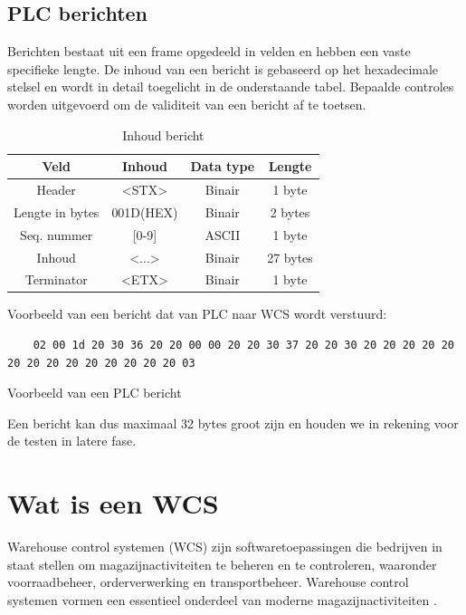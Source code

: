 \subsection{PLC berichten}
Berichten bestaat uit een frame opgedeeld in velden en hebben een vaste specifieke lengte.
De inhoud van een bericht is gebaseerd op het hexadecimale stelsel en wordt in detail toegelicht in de onderstaande tabel.
Bepaalde controles worden uitgevoerd om de validiteit van een bericht af te toetsen. 

\begin{table}[h!]
  \centering 
  \begin{tabular}{|c|c|c|c|}
    \hline
    \textbf{Veld} & \textbf{Inhoud} & \textbf{Data type} & \textbf{Lengte} \\
    \hline 
    Header & <STX> & Binair & 1 byte \\
    \hline 
    Lengte in bytes & 001D(HEX) & Binair & 2 bytes \\
    \hline 
    Seq. nummer &  [0-9] & ASCII & 1 byte  \\
    \hline 
    Inhoud & <...> & Binair & 27 bytes \\
    \hline 
    Terminator & <ETX> & Binair & 1 byte \\
    \hline
  \end{tabular}
  \caption[Message content]{\label{tab:message-content}Inhoud bericht}
\end{table}

Voorbeeld van een bericht dat van PLC naar WCS wordt verstuurd: 
\begin{listing}[h!]
  \begin{verbatim}
    02 00 1d 20 30 36 20 20 00 00 20 20 30 37 20 20 30 20 20 20 20 20 20 20 20 20 20 20 20 20 20 03
  \end{verbatim}
  \caption[Voorbeeld PLC bericht]{Voorbeeld van een PLC bericht}
\end{listing}

Een bericht kan dus maximaal 32 bytes groot zijn en houden we in rekening voor de testen in latere fase.

\section{Wat is een WCS}
Warehouse control systemen (WCS) zijn softwaretoepassingen die bedrijven in staat stellen om magazijnactiviteiten te beheren en te controleren, 
waaronder voorraadbeheer, orderverwerking en transportbeheer. 
Warehouse control systemen vormen een essentieel onderdeel van moderne magazijnactiviteiten \autocite{Rana2023}. 


